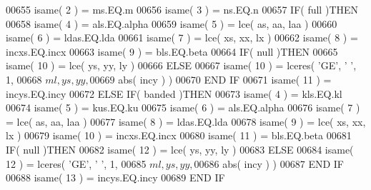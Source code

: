 \begin{DoxyCode}
00655                               isame( 2 ) = ms.EQ.m
00656                               isame( 3 ) = ns.EQ.n
00657                               \textcolor{keywordflow}{IF}( full )\textcolor{keywordflow}{THEN}
00658                                  isame( 4 ) = als.EQ.alpha
00659                                  isame( 5 ) = lce( as, aa, laa )
00660                                  isame( 6 ) = ldas.EQ.lda
00661                                  isame( 7 ) = lce( xs, xx, lx )
00662                                  isame( 8 ) = incxs.EQ.incx
00663                                  isame( 9 ) = bls.EQ.beta
00664                                  \textcolor{keywordflow}{IF}( null )\textcolor{keywordflow}{THEN}
00665                                     isame( 10 ) = lce( ys, yy, ly )
00666                                  \textcolor{keywordflow}{ELSE}
00667                                     isame( 10 ) = lceres( \textcolor{stringliteral}{'GE'}, \textcolor{stringliteral}{' '}, 1,
00668      $                                            ml, ys, yy,
00669      $                                            abs( incy ) )
00670 \textcolor{keywordflow}{                                 END IF}
00671                                  isame( 11 ) = incys.EQ.incy
00672                               \textcolor{keywordflow}{ELSE} \textcolor{keywordflow}{IF}( banded )\textcolor{keywordflow}{THEN}
00673                                  isame( 4 ) = kls.EQ.kl
00674                                  isame( 5 ) = kus.EQ.ku
00675                                  isame( 6 ) = als.EQ.alpha
00676                                  isame( 7 ) = lce( as, aa, laa )
00677                                  isame( 8 ) = ldas.EQ.lda
00678                                  isame( 9 ) = lce( xs, xx, lx )
00679                                  isame( 10 ) = incxs.EQ.incx
00680                                  isame( 11 ) = bls.EQ.beta
00681                                  \textcolor{keywordflow}{IF}( null )\textcolor{keywordflow}{THEN}
00682                                     isame( 12 ) = lce( ys, yy, ly )
00683                                  \textcolor{keywordflow}{ELSE}
00684                                     isame( 12 ) = lceres( \textcolor{stringliteral}{'GE'}, \textcolor{stringliteral}{' '}, 1,
00685      $                                            ml, ys, yy,
00686      $                                            abs( incy ) )
00687 \textcolor{keywordflow}{                                 END IF}
00688                                  isame( 13 ) = incys.EQ.incy
00689 \textcolor{keywordflow}{                              END IF}

\end{DoxyCode}

